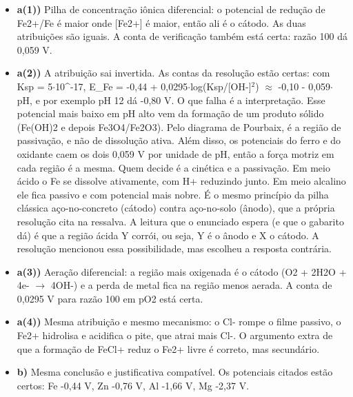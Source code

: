 \documentclass{article}%
\begin{document}
\begin{itemize}%
\item%
\textbf{a(1))} Pilha de concentração iônica diferencial: o potencial de redução de Fe2+/Fe é maior onde {[}Fe2+{]} é maior, então ali é o cátodo. As duas atribuições são iguais. A conta de verificação também está certa: razão 100 dá 0,059 V.%
\item%
\textbf{a(2))} A atribuição sai invertida. As contas da resolução estão certas: com Ksp = 5$\cdot$10\^{}{-}17, E\_Fe = -0,44 + 0,0295$\cdot$log(Ksp/{[}OH-{]}$^2$) $\approx$ -0,10 - 0,059$\cdot$pH, e por exemplo pH 12 dá -0,80 V. O que falha é a interpretação. Esse potencial mais baixo em pH alto vem da formação de um produto sólido (Fe(OH)2 e depois Fe3O4/Fe2O3). Pelo diagrama de Pourbaix, é a região de passivação, e não de dissolução ativa. Além disso, os potenciais do ferro e do oxidante caem os dois 0,059 V por unidade de pH, então a força motriz em cada região é a mesma. Quem decide é a cinética e a passivação. Em meio ácido o Fe se dissolve ativamente, com H+ reduzindo junto. Em meio alcalino ele fica passivo e com potencial mais nobre. É o mesmo princípio da pilha clássica aço{-}no{-}concreto (cátodo) contra aço{-}no{-}solo (ânodo), que a própria resolução cita na ressalva. A leitura que o enunciado espera (e que o gabarito dá) é que a região ácida Y corrói, ou seja, Y é o ânodo e X o cátodo. A resolução mencionou essa possibilidade, mas escolheu a resposta contrária.%
\item%
\textbf{a(3))} Aeração diferencial: a região mais oxigenada é o cátodo (O2 + 2H2O + 4e- $\to$ 4OH-) e a perda de metal fica na região menos aerada. A conta de 0,0295 V para razão 100 em pO2 está certa.%
\item%
\textbf{a(4))} Mesma atribuição e mesmo mecanismo: o Cl- rompe o filme passivo, o Fe2+ hidrolisa e acidifica o pite, que atrai mais Cl-. O argumento extra de que a formação de FeCl+ reduz o Fe2+ livre é correto, mas secundário.%
\item%
\textbf{b)} Mesma conclusão e justificativa compatível. Os potenciais citados estão certos: Fe -0,44 V, Zn -0,76 V, Al -1,66 V, Mg -2,37 V.%
\end{itemize}%
\end{document}
